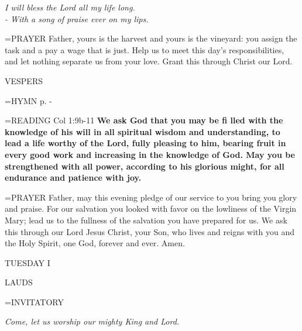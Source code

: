 \begin{center}
\textit{I will bless the Lord all my life long.\\
- With a song of praise ever on my lips.}
\end{center}

\hangindent=\parindent \small{PRAYER  Father, yours is the harvest and yours is the vineyard: you assign the task and a pay a wage that is just. Help us to meet this day’s responsibilities, and let nothing separate us from your love. Grant this through Christ our Lord.}

\begin{flushleft}\normalsize VESPERS\\\end{flushleft}

\hangindent=\parindent \small{\uppercase{HYMN} p.  \pageref{ordinaryTime:fourthHymn} - \pageref{ordinaryTime:sixthHymn} \\}

\hangindent=\parindent \small{READING} Col 1:9b-11 \textbf{We ask God that you may be fi lled with the knowledge of his will in all spiritual wisdom and understanding, to lead a life worthy of the Lord, fully pleasing to him, bearing fruit in every good work and increasing in the knowledge of God. May you be strengthened with all power, according to his glorious might, for all endurance and patience with joy.\\}

\hangindent=\parindent \small{PRAYER  Father, may this evening pledge of our service to you bring}
you glory and praise. For our salvation you looked with favor on the
lowliness of the Virgin Mary; lead us to the fullness of the salvation
you have prepared for us. We ask this through our Lord Jesus Christ,
your Son, who lives and reigns with you and the Holy Spirit, one
God, forever and ever. Amen.

\begin{center}
\normalsize TUESDAY I
\end{center}

\begin{flushleft}\normalsize LAUDS\\\end{flushleft}

\hangindent=\parindent \small{INVITATORY}
\begin{center}
\textit{Come, let us worship our mighty King and Lord.\\}
\end{center}

